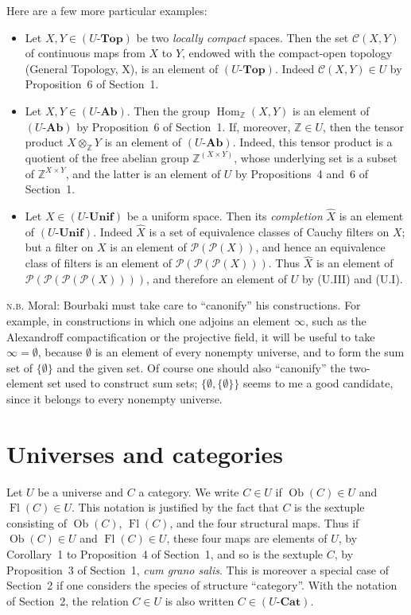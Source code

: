 \documentclass[11pt]{article}
\newcommand{\Top}{\mathbf{Top}}
\newcommand{\Ab}{\mathbf{Ab}}
\newcommand{\Unif}{\mathbf{Unif}}
\newcommand{\Cat}{\mathbf{Cat}}
\newcommand{\Ob}{\operatorname{Ob}}
\newcommand{\Hom}{\operatorname{Hom}}
\newcommand{\Fl}{\operatorname{Fl}}
\newcommand{\Pset}{\mathcal{P}}
\newcommand{\ZZ}{\mathbb{Z}}
\newcommand{\NB}{\textsc{n.b.}}
\begin{document}
Here are a few more particular examples:
\begin{itemize}[leftmargin=3em]
\item[* 1)] Let \(X,Y\in(U\text{-}\Top)\) be two \emph{locally compact} spaces. Then the set \(\mathcal C(X,Y)\) of continuous maps from \(X\) to \(Y\), endowed with the compact-open topology (General Topology, X), is an element of \((U\text{-}\Top)\). Indeed \(\mathcal C(X,Y)\in U\) by Proposition~6 of Section~1.
\item[* 2)] Let \(X,Y\in(U\text{-}\Ab)\). Then the group \(\Hom_{\ZZ}(X,Y)\) is an element of \((U\text{-}\Ab)\) by Proposition~6 of Section~1. If, moreover, \(\ZZ\in U\), then the tensor product \(X\otimes_{\ZZ}Y\) is an element of \((U\text{-}\Ab)\). Indeed, this tensor product is a quotient of the free abelian group \(\ZZ^{(X\times Y)}\), whose underlying set is a subset of \(\ZZ^{X\times Y}\), and the latter is an element of \(U\) by Propositions~4 and~6 of Section~1.
\item[* 3)] Let \(X\in(U\text{-}\Unif)\) be a uniform space. Then its \emph{completion} \(\widehat X\) is an element of \((U\text{-}\Unif)\). Indeed \(\widehat X\) is a set of equivalence classes of Cauchy filters on \(X\); but a filter on \(X\) is an element of \(\Pset(\Pset(X))\), and hence an equivalence class of filters is an element of \(\Pset(\Pset(\Pset(X)))\). Thus \(\widehat X\) is an element of \(\Pset(\Pset(\Pset(\Pset(X))))\), and therefore an element of \(U\) by (U.III) and (U.I).
\end{itemize}

\NB{} Moral: Bourbaki must take care to ``canonify'' his constructions. For example, in constructions in which one adjoins an element \(\infty\), such as the Alexandroff compactification or the projective field, it will be useful to take \(\infty=\emptyset\), because \(\emptyset\) is an element of every nonempty universe, and to form the sum set of \(\{\emptyset\}\) and the given set. Of course one should also ``canonify'' the two-element set used to construct sum sets; \(\{\emptyset,\{\emptyset\}\}\) seems to me a good candidate, since it belongs to every nonempty universe.

\section{Universes and categories}

Let \(U\) be a universe and \(C\) a category. We write \(C\in U\) if \(\Ob(C)\in U\) and \(\Fl(C)\in U\). This notation is justified by the fact that \(C\) is the sextuple consisting of \(\Ob(C)\), \(\Fl(C)\), and the four structural maps. Thus if \(\Ob(C)\in U\) and \(\Fl(C)\in U\), these four maps are elements of \(U\), by Corollary~1 to Proposition~4 of Section~1, and so is the sextuple \(C\), by Proposition~3 of Section~1, \emph{cum grano salis}. This is moreover a special case of Section~2 if one considers the species of structure ``category''. With the notation of Section~2, the relation \(C\in U\) is also written \(C\in(U\text{-}\Cat)\).
\end{document}
